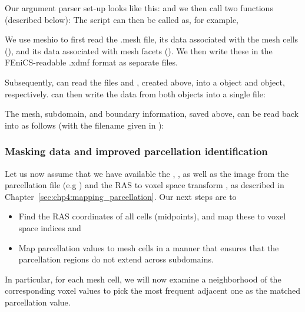 \noindent Our argument parser set-up looks like this:
\noindent and we then  call two functions (described below): 
The script can then be called as, for example, 

We use meshio to first read the .mesh file, its data associated with
the mesh cells (), and its data associated with mesh
facets (). We then write these in the FEniCS-readable
.xdmf format as separate files.

Subsequently, {\fenics} can read the files  and , 
created above, into a  object and  
object, respectively.  {\fenics} can then write the data from both objects 
into a single  file:

The mesh, subdomain, and boundary information, saved above, can be read 
back into {\fenics} as follows (with the filename 
given in ):

\subsubsection*{Masking data and improved parcellation identification}

Let us now assume that we have available the ,
, as well as the image  from the
parcellation file (e.g ) and the RAS to voxel space
transform , as described in
Chapter~\ref{sec:chp4:mapping_parcellation}. Our next steps are to
\begin{itemize}
\item
  Find the RAS coordinates of all cells (midpoints), and map these to
  voxel space indices and
\item
  Map parcellation values to mesh cells in a manner that ensures that the
  parcellation regions do not extend across subdomains.
\end{itemize}
In particular, for each mesh cell, we will now examine a neighborhood of the
corresponding voxel values to pick the most frequent adjacent one as
the matched parcellation value. 

